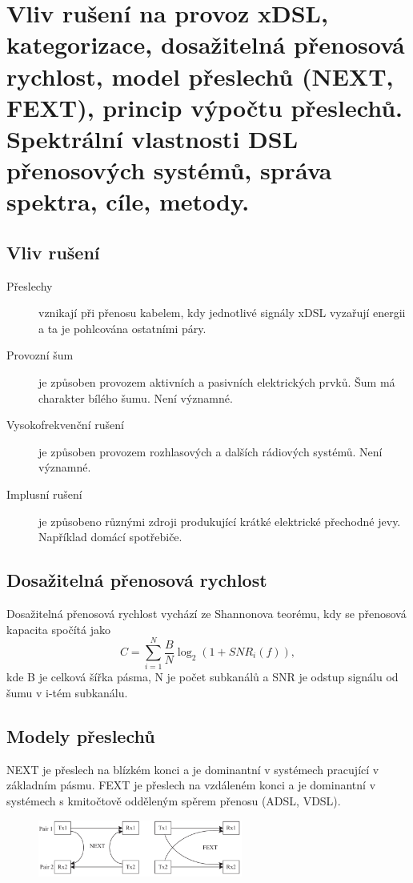 \clearpage
\section{Vliv rušení na provoz xDSL, kategorizace, dosažitelná přenosová rychlost, model přeslechů (NEXT, FEXT), princip výpočtu přeslechů. Spektrální vlastnosti DSL přenosových systémů, správa spektra, cíle, metody.}

\subsection{Vliv rušení}
\begin{description}
    \item[Přeslechy] vznikají při přenosu kabelem, kdy jednotlivé signály xDSL vyzařují energii a ta je pohlcována ostatními páry.
    \item[Provozní šum] je způsoben provozem aktivních a pasivních elektrických prvků. Šum má charakter bílého šumu.
    Není významné.
    \item[Vysokofrekvenční rušení] je způsoben provozem rozhlasových a dalších rádiových systémů.
    Není významné.
    \item [Implusní rušení] je způsobeno různými zdroji produkující krátké elektrické přechodné jevy. Například domácí spotřebiče. 
\end{description}

\subsection{Dosažitelná přenosová rychlost}

Dosažitelná přenosová rychlost vychází ze Shannonova teorému, kdy se přenosová kapacita spočítá jako
\[C = \sum_{i=1}^{N}\frac{B}{N}\log_2(1 + SNR_i(f)),\]
kde B je celková šířka pásma, N je počet subkanálů a SNR je odstup signálu od šumu v i-tém subkanálu.

\subsection{Modely přeslechů}

NEXT je přeslech na blízkém konci a je dominantní v systémech pracující v základním pásmu.
FEXT je přeslech na vzdáleném konci a je dominantní v systémech s kmitočtově odděleným spěrem přenosu (ADSL, VDSL).

\begin{figure}[h]
    \centering
    \includegraphics[width=0.6\textwidth]{images/080.png}
\end{figure}


